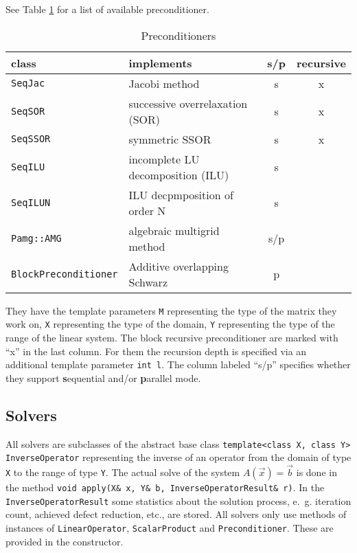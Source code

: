 \documentclass[11pt]{article}
\begin{document}
{See Table \ref{tab:precond} for a list of available
preconditioner. 
\begin{table}[htb]
  \centering
  \caption{Preconditioners}
  \label{tab:precond}
  \begin{tabular}{|l|l|c|c|}
    \hline
    \textbf{class} & \textbf{implements}&\textbf{s/p}& \textbf{recursive}\\\hline\hline
    \lstinline!SeqJac! & Jacobi method& s & x\\
    \lstinline!SeqSOR! & successive overrelaxation (SOR) & s& x\\
    \lstinline!SeqSSOR! & symmetric SSOR & s&x\\
    \lstinline!SeqILU! & incomplete LU decomposition (ILU)& s&\\
    \lstinline!SeqILUN! & ILU decpmposition of order N &s&\\
    \lstinline!Pamg::AMG! & algebraic multigrid method &s/p&\\
    \lstinline!BlockPreconditioner!& Additive overlapping Schwarz&p&\\\hline
  \end{tabular}
\end{table}
They have the template parameters \lstinline!M!
representing the type of the matrix they work on, \lstinline!X!
representing the type of the domain, \lstinline!Y! representing the
type of the range of the linear system. The block recursive
preconditioner are marked with ``x'' in the last column. For them the
recursion depth is specified via an additional template parameter
\lstinline!int l!. The column labeled ``s/p''
specifies whether they support {\bf s}equential and/or {\bf p}arallel
mode.

\subsection{Solvers}
\label{sec:solvers}

All solvers are subclasses of the abstract base class
\lstinline!template<class X, class Y> InverseOperator! representing
the inverse of an operator from the domain of type \lstinline!X! to
the range of type \lstinline!Y!. The actual solve of the system
$A(\vec x)=\vec b$ is done in the method 
\lstinline!void apply(X& x, Y& b, InverseOperatorResult& r)!. In the
\lstinline!InverseOperatorResult! some statistics about the solution
process, e.~g. iteration count, achieved defect reduction, etc., are
stored.
All solvers only use methods of instances of
\lstinline!LinearOperator!, \lstinline!ScalarProduct! and
\lstinline!Preconditioner!. These are provided in the constructor.

}
\end{document}

